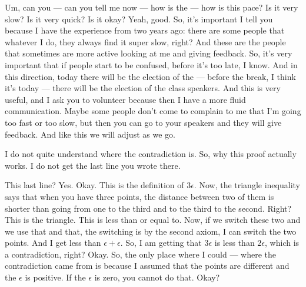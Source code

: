 
\begin{spoken-clean}[00:12:38 - 00:14:14]
Um, can you — can you tell me now — how is the — how is this pace? Is it very slow? Is it very quick? Is it okay? Yeah, good. So, it's important I tell you because I have the experience from two years ago: there are some people that whatever I do, they always find it super slow, right? And these are the people that sometimes are more active looking at me and giving feedback. So, it's very important that if people start to be confused, before it's too late, I know. And in this direction, today there will be the election of the — before the break, I think it's today — there will be the election of the class speakers. And this is very useful, and I ask you to volunteer because then I have a more fluid communication. Maybe some people don't come to complain to me that I'm going too fast or too slow, but then you can go to your speakers and they will give feedback. And like this we will adjust as we go.
\end{spoken-clean}

\begin{student-question}
I do not quite understand where the contradiction is. So, why this proof actually works. I do not get the last line you wrote there.
\end{student-question}

\begin{spoken-clean}[continued]
This last line?  Yes. Okay. This is the definition of $3\epsilon$. Now, the triangle inequality says that when you have three points, the distance between two of them is shorter than going from one to the third and to the third to the second. Right? This is the triangle. This is less than or equal to. Now, if we switch these two and we use that and that, the switching is by the second axiom, I can switch the two points. And I get less than $\epsilon + \epsilon$. So, I am getting that $3\epsilon$ is less than $2\epsilon$, which is a contradiction, right? Okay. So, the only place where I could — where the contradiction came from is because I assumed that the points are different and the $\epsilon$ is positive. If the $\epsilon$ is zero, you cannot do that. Okay?
\end{spoken-clean}


